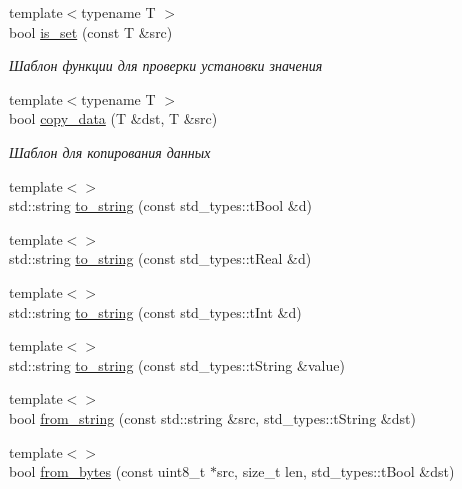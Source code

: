 \begin{DoxyCompactItemize}
{\footnotesize template$<$typename T $>$ }\\bool \hyperlink{namespaceLIBKMS__namespace_1_1holder__util_a7e56d3601efc7f34cdd9d4cfb699c100}{is\-\_\-set} (const T \&src)
\begin{DoxyCompactList}\small\item\em Шаблон функции для проверки установки значения \end{DoxyCompactList}\item 
{\footnotesize template$<$typename T $>$ }\\bool \hyperlink{namespaceLIBKMS__namespace_1_1holder__util_a38a7545f9c34955520ea5e09ecadd6de}{copy\-\_\-data} (T \&dst, T \&src)
\begin{DoxyCompactList}\small\item\em Шаблон для копирования данных \end{DoxyCompactList}\item 
{\footnotesize template$<$$>$ }\\std\-::string \hyperlink{namespaceLIBKMS__namespace_1_1holder__util_a3b09772362bd2dfcc6d8c815a2a17714}{to\-\_\-string} (const std\-\_\-types\-::t\-Bool \&d)
\item 
{\footnotesize template$<$$>$ }\\std\-::string \hyperlink{namespaceLIBKMS__namespace_1_1holder__util_adff56c8a003b35a1416ea79b5ffb96a1}{to\-\_\-string} (const std\-\_\-types\-::t\-Real \&d)
\item 
{\footnotesize template$<$$>$ }\\std\-::string \hyperlink{namespaceLIBKMS__namespace_1_1holder__util_a286232c0d65ab9d20250b6ad81049457}{to\-\_\-string} (const std\-\_\-types\-::t\-Int \&d)
\item 
{\footnotesize template$<$$>$ }\\std\-::string \hyperlink{namespaceLIBKMS__namespace_1_1holder__util_a6695a085005f1cd5c405c5bae944f580}{to\-\_\-string} (const std\-\_\-types\-::t\-String \&value)
\item 
{\footnotesize template$<$$>$ }\\bool \hyperlink{namespaceLIBKMS__namespace_1_1holder__util_a4b7a0123fb5a66cd39453c79b109afc8}{from\-\_\-string} (const std\-::string \&src, std\-\_\-types\-::t\-String \&dst)
\item 
{\footnotesize template$<$$>$ }\\bool \hyperlink{namespaceLIBKMS__namespace_1_1holder__util_a85eaede4657c0cbfc37731777afe0943}{from\-\_\-bytes} (const uint8\-\_\-t $\ast$src, size\-\_\-t len, std\-\_\-types\-::t\-Bool \&dst)

\end{DoxyCompactItemize}
